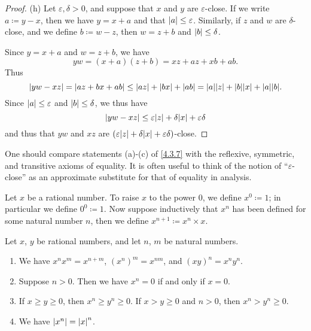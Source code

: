 \begin{proof}{(h)}
  Let \(\varepsilon, \delta > 0\), and suppose that \(x\) and \(y\) are \(\varepsilon\)-close.
  If we write \(a \coloneqq y - x\), then we have \(y = x + a\) and that \(\left\lvert a\right\rvert \leq \varepsilon\).
  Similarly, if \(z\) and \(w\) are \(\delta\)-close, and we define \(b \coloneqq w - z\), then \(w = z + b\) and \(\left\lvert b\right\rvert \leq \delta\).

  Since \(y = x + a\) and \(w = z + b\), we have
  \[
    yw = (x + a)(z + b) = xz + az + xb + ab.
  \]
  Thus
  \[
    \abs{yw - xz} = \abs{az + bx + ab} \leq \abs{az} + \abs{bx} + \abs{ab} = \abs{a}\abs{z} + \abs{b}\abs{x} + \abs{a}\abs{b}.
  \]
  Since \(\left\lvert a\right\rvert \leq \varepsilon\) and \(\left\lvert b\right\rvert \leq \delta\), we thus have
  \[
    \abs{yw - xz} \leq \varepsilon\abs{z} + \delta\abs{x} + \varepsilon\delta
  \]
  and thus that \(yw\) and \(xz\) are \((\varepsilon\abs{z} + \delta\abs{x} + \varepsilon\delta)\)-close.
\end{proof}

\begin{remark}\label{4.3.8}
  One should compare statements (a)-(c) of \cref{4.3.7} with the reflexive, symmetric, and transitive axioms of equality.
  It is often useful to think of the notion of ``\(\varepsilon\)-close'' as an approximate substitute for that of equality in analysis.
\end{remark}

\begin{definition}\label{4.3.9}
  Let \(x\) be a rational number.
  To raise \(x\) to the power \(0\), we define \(x^0 \coloneqq 1\);
  in particular we define \(0^0 \coloneqq 1\).
  Now suppose inductively that \(x^n\) has been defined for some natural number \(n\), then we define \(x^{n+1} \coloneqq x^n \times x\).
\end{definition}

\begin{proposition}\label{4.3.10}
  Let \(x\), \(y\) be rational numbers, and let \(n\), \(m\) be natural numbers.
  \begin{enumerate}
    \item We have \(x^n x^m = x^{n + m}\), \((x^n)^m = x^{nm}\), and \((xy)^n = x^n y^n\).
    \item Suppose \(n > 0\).
          Then we have \(x^n = 0\) if and only if \(x = 0\).
    \item If \(x \geq y \geq 0\), then \(x^n \geq y^n \geq 0\).
          If \(x > y \geq 0\) and \(n > 0\), then \(x^n > y^n \geq 0\).
    \item We have \(\left\lvert x^n\right\rvert = \left\lvert x\right\rvert^n\).
  \end{enumerate}
\end{proposition}

